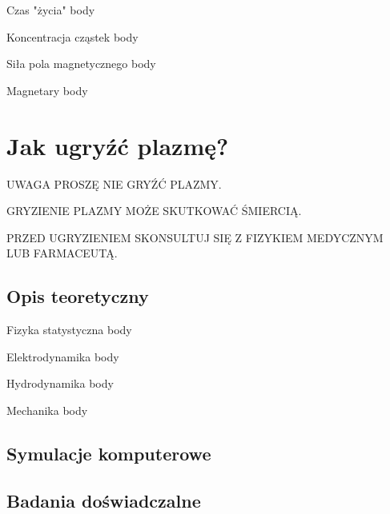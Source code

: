 \documentclass{beamer}
\begin{document}
\begin{frame}[t]{Czas "życia"}
  body
\end{frame}

\begin{frame}[t]{Koncentracja cząstek}
  body
\end{frame}

\begin{frame}[t]{Siła pola magnetycznego}
  body
\end{frame}

\begin{frame}[t]{Magnetary}
  body
\end{frame}

\section{Jak ugryźć plazmę?}
\begin{frame}[t]{UWAGA}
  PROSZĘ NIE GRYŹĆ PLAZMY.

  GRYZIENIE PLAZMY MOŻE SKUTKOWAĆ ŚMIERCIĄ.

  PRZED UGRYZIENIEM SKONSULTUJ SIĘ Z FIZYKIEM MEDYCZNYM LUB FARMACEUTĄ.
\end{frame}
\subsection{Opis teoretyczny}

\begin{frame}[t]{Fizyka statystyczna}
  body
\end{frame}


\begin{frame}[t]{Elektrodynamika}
  body
\end{frame}

\begin{frame}[t]{Hydrodynamika}
  body
\end{frame}

\begin{frame}[t]{Mechanika}
  body
\end{frame}

\subsection{Symulacje komputerowe}

\subsection{Badania doświadczalne}
\end{document}
